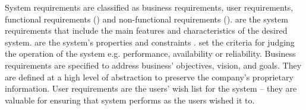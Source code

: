 System requirements are classified as business requirements, user
requirements, functional requirements (\FR) and non-functional requirements
(\NFR). \FR are the system requirements that include the
main features and characteristics of the desired system. \NFR are the
system's properties and constraints \cite{Davis:1993, Glinz}. \NFR set the
criteria for judging the operation of the system e.g.
performance, availability or reliability. Business requirements are specified to
address business' objectives, vision, and goals. They are defined at a high
level of abstraction to preserve the company's proprietary information.
User requirements are the users' wish list for the system -- they are
valuable for ensuring that system performs as the users wished it to.
